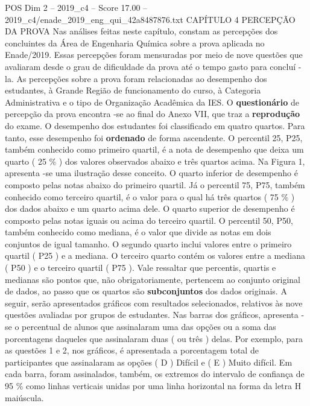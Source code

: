 \begin{textsample}{POS Dim 2 – 2019\_c4 – Score 17.00 – 2019\_c4/enade\_2019\_eng\_qui\_42a8487876.txt}  \label{ex:f2_pos_047}
CAPÍTULO 4 PERCEPÇÃO DA PROVA Nas análises feitas neste capítulo, constam as percepções dos concluintes da Área de Engenharia Química sobre a prova aplicada no Enade/2019.
Essas percepções foram mensuradas por meio de nove questões que avaliaram desde o grau de dificuldade da prova até o tempo gasto para concluí -la.
As percepções sobre a prova foram relacionadas ao desempenho dos estudantes, à Grande Região de funcionamento do curso, à Categoria Administrativa e o tipo de Organização Acadêmica da IES.
O \textbf{questionário} de percepção da prova encontra -se ao final do Anexo VII, que traz a \textbf{reprodução} do exame.
O desempenho dos estudantes foi classificado em quatro quartos.
Para tanto, esse desempenho foi \textbf{ordenado} de forma ascendente.
O percentil 25, P25, também conhecido como primeiro quartil, é a nota de desempenho que deixa um quarto ( 25 \% ) dos valores observados abaixo e três quartos acima.
Na Figura 1, apresenta -se uma ilustração desse conceito.
O quarto inferior de desempenho é composto pelas notas abaixo do primeiro quartil.
Já o percentil 75, P75, também conhecido como terceiro quartil, é o valor para o qual há três quartos ( 75 \% ) dos dados abaixo e um quarto acima dele.
O quarto superior de desempenho é composto pelas notas iguais ou acima do terceiro quartil.
O percentil 50, P50, também conhecido como mediana, é o valor que divide as notas em dois conjuntos de igual tamanho.
O segundo quarto inclui valores entre o primeiro quartil ( P25 ) e a mediana.
O terceiro quarto contém os valores entre a mediana ( P50 ) e o terceiro quartil ( P75 ).
Vale ressaltar que percentis, quartis e medianas são pontos que, não obrigatoriamente, pertencem ao conjunto original de dados, ao passo que os quartos são \textbf{subconjuntos} dos dados originais.
A seguir, serão apresentados gráficos com resultados selecionados, relativos às nove questões avaliadas por grupos de estudantes.
Nas barras dos gráficos, apresenta -se o percentual de alunos que assinalaram uma das opções ou a soma das porcentagens daqueles que assinalaram duas ( ou três ) delas.
Por exemplo, para as questões 1 e 2, nos gráficos, é apresentada a porcentagem total de participantes que assinalaram as opções ( D ) Difícil e ( E ) Muito difícil.
Em cada barra, foram assinalados, também, os extremos do intervalo de confiança de 95 \% como linhas verticais unidas por uma linha horizontal na forma da letra H maiúscula.

\end{textsample}
